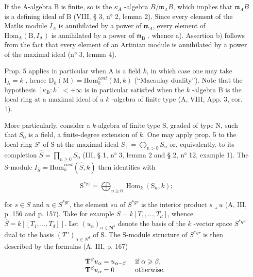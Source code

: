 If the A-algebra B is finite, so is the \(\kappa_{A}\) -algebra \(B/\mathfrak{m}_{A}B\), which implies that \(\mathfrak{m}_{A}B\) is a defining ideal of B (VIII, § 3, n° 2, lemma 2). Since every element of the Matlis module \(I_{A}\) is annihilated by a power of \(\mathfrak{m}_{A}\), every element of \(\mathrm{Hom}_{\mathrm{A}}(\mathrm{B}, I_{\mathrm{A}})\) is annihilated by a power of \(\mathfrak{m}_{\mathrm{B}}\) , whence a). Assertion b) follows from the fact that every element of an Artinian module is annihilated by a power of the maximal ideal (n° 3, lemma 4).

Prop. 5 applies in particular when A is a field \(k\), in which case one may take \(\mathrm{I}_{\mathrm{A}} = k\) , hence \(\mathrm{D}_{k}(\mathrm{M}) = \mathrm{Hom}_{k}^{cont}(\mathrm{M}, k)\) (“Macaulay duality”). Note that the hypothesis \([\kappa_{\mathrm{B}} : k] < +\infty\) is in particular satisfied when the \(k\) -algebra B is the local ring at a maximal ideal of a \(k\) -algebra of finite type (A, VIII, App. 3, cor. 1).

More particularly, consider a \(k\)-algebra of finite type S, graded of type N, such that \(S_0\) is a field, a finite-degree extension of \(k\). One may apply prop. 5 to the local ring \(S'\) of S at the maximal ideal \(S_+ = \bigoplus_{n > 0} S_n\) or, equivalently, to its completion \(\widehat{S} = \prod_{n \geqslant 0} S_n\) (III, § 1, n° 3, lemma 2 and § 2, n° 12, example 1). The S-module \(I_{\widehat{S}} = \text{Hom}_k^{cont}(\widehat{S}, k)\) then identifies with

\[
\mathrm{S} ^ {* \mathrm{gr}} = \bigoplus_ {n \geqslant 0} \operatorname{Hom} _ {k} (\mathrm{S} _ {n}, k) ;
\]

for \(s \in S\) and \(u \in S^{*gr}\), the element \(su\) of \(S^{*gr}\) is the interior product \(s \lrcorner u\) (A, III, p. 156 and p. 157). Take for example \(S = k[T_1, \ldots, T_d]\), whence \(\widehat{S} = k[[T_1, \ldots, T_d]]\). Let \((u_\alpha)_{\alpha \in \mathbf{N}^d}\) denote the basis of the \(k\) -vector space \(S^{*gr}\) dual to the basis \((T^\alpha)_{\alpha \in N^d}\) of S. The S-module structure of \(S^{*gr}\) is then described by the formulas (A, III, p. 167)

\[
\begin{array}{l l} \mathbf {T} ^ {\beta} u _ {\alpha} = u _ {\alpha - \beta} & \text { if } \alpha \geqslant \beta , \\ \mathbf {T} ^ {\beta} u _ {\alpha} = 0 & \text { otherwise. } \end{array}
\]
\relax{}
